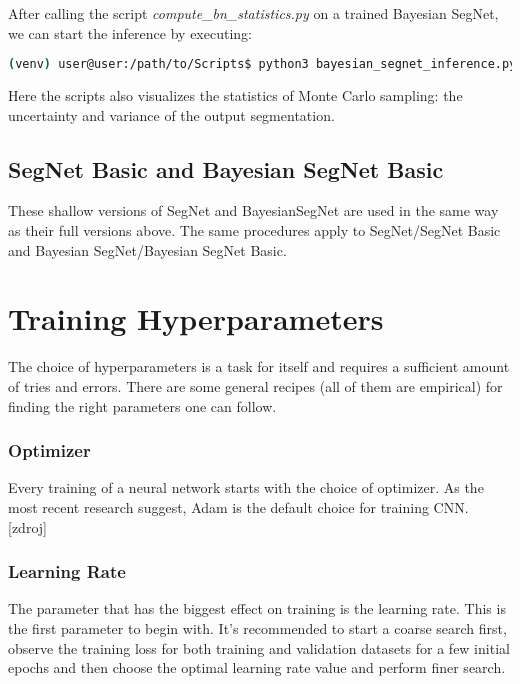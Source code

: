 After calling the script \textit{compute\_bn\_statistics.py} on a trained Bayesian SegNet, we can start the inference by executing:

\begin{lstlisting}[language=bash]
(venv) user@user:/path/to/Scripts$ python3 bayesian_segnet_inference.py /path/to/inference.prototxt /path/to/final_weights.caffemodel /path/to/videofile.avi 
\end{lstlisting}

Here the scripts also visualizes the statistics of Monte Carlo sampling: the uncertainty and variance of the output segmentation.

\subsection{SegNet Basic and Bayesian SegNet Basic}

These shallow versions of SegNet and BayesianSegNet are used in the same way as their full versions above. The same procedures apply to SegNet/SegNet Basic and Bayesian SegNet/Bayesian SegNet Basic.

\section{Training Hyperparameters}

The choice of hyperparameters is a task for itself and requires a sufficient amount of tries and errors. There are some general recipes (all of them are empirical) for finding the right parameters one can follow. 

\subsubsection{Optimizer}

Every training of a neural network starts with the choice of optimizer. As the most recent research suggest, Adam is the default choice for training CNN. [zdroj] 

\subsubsection{Learning Rate}

The parameter that has the biggest effect on training is the learning rate. This is the first parameter to begin with. It's recommended to start a coarse search first, observe the training loss for both training and validation datasets for a few initial epochs and then choose the optimal learning rate value and perform finer search. 

